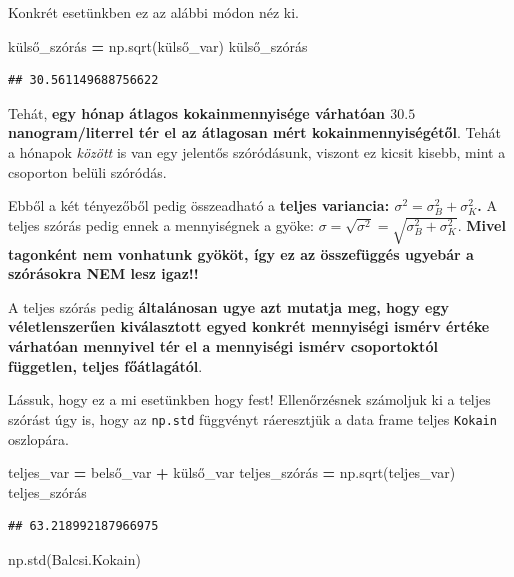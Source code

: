 \documentclass[
]{book}
\newenvironment{Shaded}{\begin{snugshade}}{\end{snugshade}}
\newcommand{\NormalTok}[1]{#1}
\newcommand{\OperatorTok}[1]{\textcolor[rgb]{0.81,0.36,0.00}{\textbf{#1}}}
\begin{document}
Konkrét esetünkben ez az alábbi módon néz ki.

\begin{Shaded}
\begin{Highlighting}[]
\NormalTok{külső\_szórás }\OperatorTok{=}\NormalTok{ np.sqrt(külső\_var)}
\NormalTok{külső\_szórás}
\end{Highlighting}
\end{Shaded}

\begin{verbatim}
## 30.561149688756622
\end{verbatim}

Tehát, \textbf{egy hónap átlagos kokainmennyisége várhatóan \(30.5\) nanogram/literrel tér el az átlagosan mért kokainmennyiségétől}. Tehát a hónapok \emph{között} is van egy jelentős szóródásunk, viszont ez kicsit kisebb, mint a csoporton belüli szóródás.

Ebből a két tényezőből pedig összeadható a \textbf{teljes variancia: \(\sigma^2=\sigma_B^2+\sigma_K^2\).} A teljes szórás pedig ennek a mennyiségnek a gyöke: \(\sigma=\sqrt{\sigma^2}=\sqrt{\sigma_B^2+\sigma_K^2}\). \textbf{Mivel tagonként nem vonhatunk gyököt, így ez az összefüggés ugyebár a szórásokra NEM lesz igaz!!}

A teljes szórás pedig \textbf{általánosan ugye azt mutatja meg, hogy egy véletlenszerűen kiválasztott egyed konkrét mennyiségi ismérv értéke várhatóan mennyivel tér el a mennyiségi ismérv csoportoktól független, teljes főátlagától}.

Lássuk, hogy ez a mi esetünkben hogy fest! Ellenőrzésnek számoljuk ki a teljes szórást úgy is, hogy az \texttt{np.std} függvényt ráeresztjük a data frame teljes \texttt{Kokain} oszlopára.

\begin{Shaded}
\begin{Highlighting}[]
\NormalTok{teljes\_var }\OperatorTok{=}\NormalTok{ belső\_var }\OperatorTok{+}\NormalTok{ külső\_var}
\NormalTok{teljes\_szórás }\OperatorTok{=}\NormalTok{ np.sqrt(teljes\_var)}
\NormalTok{teljes\_szórás}
\end{Highlighting}
\end{Shaded}

\begin{verbatim}
## 63.218992187966975
\end{verbatim}

\begin{Shaded}
\begin{Highlighting}[]
\NormalTok{np.std(Balcsi.Kokain)}
\end{Highlighting}
\end{Shaded}
\end{document}
